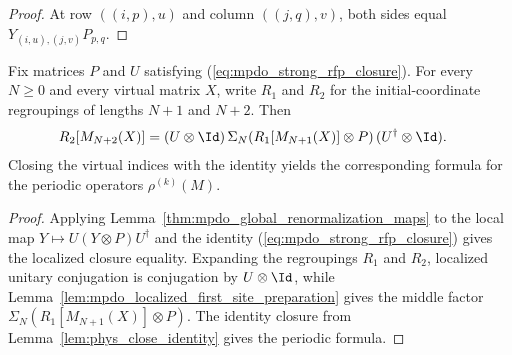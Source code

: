 \begin{proof}
    \leanok
    At row $((i,p),u)$ and column $((j,q),v)$, both sides equal
    $Y_{(i,u),(j,v)}P_{p,q}$.
\end{proof}

\begin{lemma}
    \label{thm:mpdo_strong_rfp_global_operator_identity}
    \leanok
    Fix matrices $P$ and $U$ satisfying
    (\ref{eq:mpdo_strong_rfp_closure}). For every $N\geq0$ and every virtual
    matrix $X$, write $R_1$ and $R_2$ for the initial-coordinate regroupings
    of lengths $N+1$ and $N+2$. Then
    \begin{align}
        R_2[M_{N+2}(X)]
         & =(U\otimes\Id)\,
        \Sigma_N\!\left(R_1[M_{N+1}(X)]\otimes P\right)
        (U^\dagger\otimes\Id).
        \label{eq:mpdo_strong_rfp_global_closure}
    \end{align}
    Closing the virtual indices with the identity yields the corresponding
    formula for the periodic operators $\rho^{(k)}(M)$.
\end{lemma}

\begin{proof}
    \leanok
    Applying Lemma~\ref{thm:mpdo_global_renormalization_maps} to the local map
    $Y\mapsto U(Y\otimes P)U^\dagger$ and the identity
    (\ref{eq:mpdo_strong_rfp_closure}) gives the localized closure
    equality. Expanding the regroupings $R_1$ and $R_2$, localized unitary
    conjugation is conjugation by $U\otimes\Id$, while
    Lemma~\ref{lem:mpdo_localized_first_site_preparation} gives the middle
    factor $\Sigma_N\!\left(R_1[M_{N+1}(X)]\otimes P\right)$. The identity closure from
    Lemma~\ref{lem:phys_close_identity} gives the periodic formula.
\end{proof}

